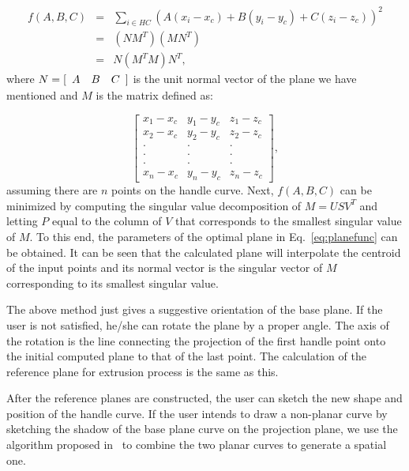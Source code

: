 \begin{eqnarray}
\label{eq:planeobjnew}
    f(A,B,C) &=& \sum\limits_{i \in HC} {(A(x_i-x_c)+B(y_i-y_c)+C(z_i-z_c))^2}\nonumber\\
    &=& (NM^T)(MN^T)\nonumber\\
    &=& N (M^TM) N^T,
\end{eqnarray}
where $N = [\begin{array}{*{20}c} A & B & C \end{array}]$
is the unit normal vector of the plane we have mentioned
and $M$ is the matrix defined as:

\begin{equation*}
\begin{bmatrix}
x_1-x_c & y_1-y_c & z_1-z_c\\[-1em]
x_2-x_c & y_2-y_c & z_2-z_c\\[-1em]
\cdot & \cdot & \cdot\\[-1em]
\cdot & \cdot & \cdot\\[-1em]
\cdot & \cdot & \cdot\\[-1em]
x_n-x_c & y_n-y_c & z_n-z_c
\end{bmatrix},
\end{equation*}
assuming there are $n$ points on the handle curve. Next, $f(A,B,C)$
can be minimized by computing the singular value decomposition
of $M=USV^T$ and letting $P$ equal to the column of $V$
that corresponds to the smallest singular value of $M$.
To this end, the parameters of the optimal plane in
Eq.~\ref{eq:planefunc} can be obtained. It can be seen that
the calculated plane will interpolate the centroid of the
input points and its normal vector is the singular vector
of $M$ corresponding to its smallest singular value.



The above method just gives a suggestive orientation of the base
plane. If the user is not satisfied, he/she can rotate the plane by
a proper angle. The axis of the rotation is the line connecting the
projection of the first handle point onto the initial computed plane
to that of the last point. The calculation of the reference plane
for extrusion process is the same as this.

After the reference planes are constructed, the user can sketch the
new shape and position of the handle curve. If the user intends to
draw a non-planar curve by sketching the shadow of the base plane
curve on the projection plane, we use the algorithm proposed
in~\cite{CMZHB99} to combine the two planar curves to generate a
spatial one.

